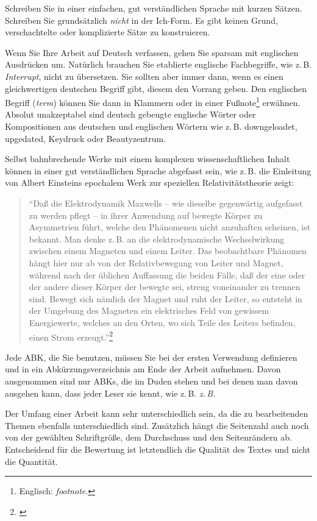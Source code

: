 \documentclass[a4paper,11pt,headings=normal]{scrartcl}
\begin{document}
Schreiben Sie in einer einfachen, gut verständlichen Sprache mit kurzen Sätzen. Schreiben Sie grundsätzlich \textit{nicht} in der Ich-Form. Es gibt keinen Grund, verschachtelte oder komplizierte Sätze zu konstruieren.

Wenn Sie Ihre Arbeit auf Deutsch verfassen, gehen Sie sparsam mit englischen Ausdrücken um. Natürlich brauchen Sie etablierte englische Fachbegriffe, wie z.\,B. \textit{Interrupt}, nicht zu übersetzen. Sie sollten aber immer dann, wenn es einen gleichwertigen deutschen Begriff gibt, diesem den Vorrang geben. Den englischen Begriff (\textit{term}) können Sie dann in Klammern oder in einer Fußnote\footnote{Englisch: \textit{footnote}.} erwähnen. Absolut unakzeptabel sind deutsch gebeugte englische Wörter oder Kompositionen aus deutschen und englischen Wörtern wie z.\,B. downgeloadet, upgedated, Keydruck oder Beautyzentrum.

Selbst bahnbrechende Werke mit einem komplexen wissenschaftlichen Inhalt können in einer gut verständlichen Sprache abgefasst sein, wie z.\,B. die Einleitung von Albert Einsteins epochalem Werk zur speziellen Relativitätstheorie zeigt:
\begin{quote}\begin{small}
"`Daß die Elektrodynamik Maxwells -- wie dieselbe gegenwärtig aufgefasst zu werden pflegt -- in ihrer Anwendung auf bewegte Körper zu Asymmetrien führt, welche den Phänomenen nicht anzuhaften scheinen, ist bekannt. Man denke z.\,B. an die elektrodynamische Wechselwirkung zwischen einem Magneten und einem Leiter. Das beobachtbare Phänomen hängt hier nur ab von der Relativbewegung von Leiter und Magnet, während nach der üblichen Auffassung die beiden Fälle, daß der eine oder der andere dieser Körper der bewegte sei, streng voneinander zu trennen sind. Bewegt sich nämlich der Magnet und ruht der Leiter, so entsteht in der Umgebung des Magneten ein elektrisches Feld von gewissem Energiewerte, welches an den Orten, wo sich Teile des Leiters befinden, einen Strom erzeugt."'\footnote{\autocite{Einstein1905}}
\end{small}\end{quote}

\noindent Jede \ac{ABK}, die Sie benutzen, müssen Sie bei der ersten Verwendung definieren und in ein Abkürzungsverzeichnis am Ende der Arbeit aufnehmen. Davon ausgenommen sind nur \acp{ABK}, die im Duden stehen und bei denen man davon ausgehen kann, dass jeder Leser sie kennt, wie z.\,B. \textit{z.\,B.}

Der Umfang einer Arbeit kann sehr unterschiedlich sein, da die zu bearbeitenden Themen ebenfalls unterschiedlich sind. Zusätzlich hängt die Seitenzahl auch noch von der gewählten Schriftgröße, dem Durchschuss und den Seitenrändern ab. Entscheidend für die Bewertung ist letztendlich die Qualität des Textes und nicht die Quantität.
\end{document}
